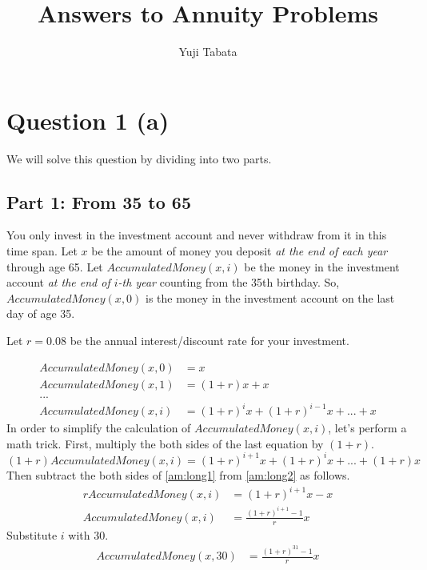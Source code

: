 \documentclass[11pt]{report}
\begin{document}
\title{Answers to Annuity Problems}
\author{Yuji Tabata}
\maketitle

\section*{Question 1 (a)}
\newcommand{\AccumulatedMoney}{\mathit{AccumulatedMoney}}

We will solve this question by dividing into two parts.

\subsection*{Part 1: From 35 to 65}
You only invest in the investment account and never withdraw from it in this time span.
Let $x$ be the amount of money you deposit \emph{at the end of each year} through age 65.
Let $\AccumulatedMoney(x, i)$ be the money in the investment account \emph{at the end of $i$-th year} counting from the 35th birthday.
So, $\AccumulatedMoney(x, 0)$ is the money in the investment account on the last day of age 35.


Let $r=0.08$ be the annual interest/discount rate for your investment.

\begin{align}
    \AccumulatedMoney(x, 0) &= x \\
    \AccumulatedMoney(x, 1) &= (1+r)x + x \\
    ... \\
    \AccumulatedMoney(x, i) &= (1+r)^{i}x + (1+r)^{i-1}x + ... + x \label{am:long1}
\end{align}
In order to simplify the calculation of $\AccumulatedMoney(x, i)$, let's perform a math trick. First, multiply the both sides of the last equation by $(1+r)$.
\begin{equation}
  (1+r)\AccumulatedMoney(x, i) = (1+r)^{i+1}x + (1+r)^{i}x + ... + (1+r)x \label{am:long2}
\end{equation}
Then subtract the both sides of \eqref{am:long1} from \eqref{am:long2} as follows.
\begin{align}
  r\AccumulatedMoney(x, i) &= (1 + r) ^{i+1}x - x \\
  \AccumulatedMoney(x, i) &= \frac{(1+r)^{i+1}-1}{r}x \label{am:4}
\end{align}
Substitute $i$ with 30.
\begin{align}
  \AccumulatedMoney(x, 30) &= \frac{(1 + r)^{31}-1}{r}x
\end{align}
\end{document}
